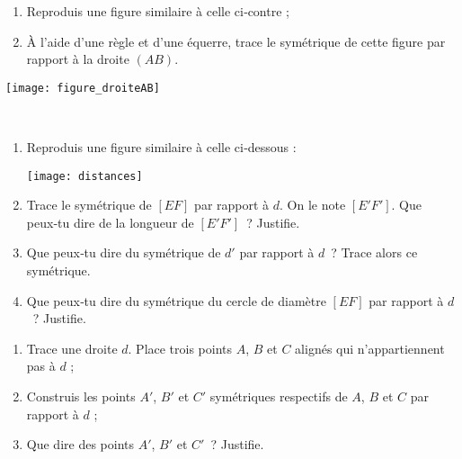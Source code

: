 \begin{exercice}
\begin{minipage}[c]{0.44\linewidth}
\begin{enumerate}
 \item Reproduis une figure similaire à celle ci‑contre ;
 \item À l'aide d'une règle et d'une équerre, trace le symétrique de cette figure par rapport à la droite $(AB)$.
 \end{enumerate}
 \end{minipage} \hfill%
 \begin{minipage}[c]{0.52\linewidth}
  \texttt{[image: figure\_droiteAB]}
   \end{minipage} \\
\end{exercice}


\begin{exercice}
\begin{enumerate}
 \item Reproduis une figure similaire à celle ci‑dessous : 
 \begin{center} \texttt{[image: distances]} \end{center}
 \item Trace le symétrique de $[EF]$ par rapport à $d$. On le note $[E'F']$. Que peux‑tu dire de la longueur de $[E'F']$ ? Justifie.
 \item Que peux‑tu dire du symétrique de $d'$ par rapport à $d$ ? Trace alors ce symétrique.
 \item Que peux‑tu dire du symétrique du cercle de diamètre $[EF]$ par rapport à $d$ ? Justifie.
 \end{enumerate}
\end{exercice}


\begin{exercice}
\begin{enumerate}
 \item Trace une droite $d$. Place trois points $A$, $B$ et $C$ alignés qui n'appartiennent pas à $d$ ;
 \item Construis les points $A'$, $B'$ et $C'$ symétriques respectifs de $A$, $B$ et $C$ par rapport à $d$ ;
 \item Que dire des points $A'$, $B'$ et $C'$ ? Justifie.
 \end{enumerate}
\end{exercice}


